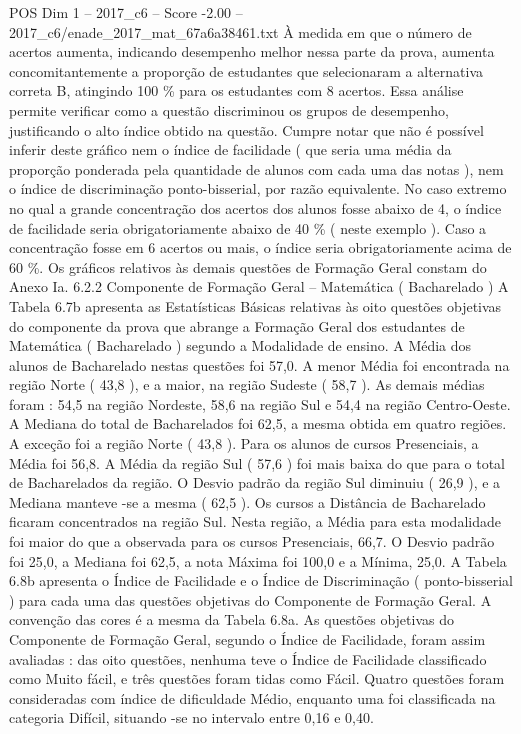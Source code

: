 \begin{textsample}{POS Dim 1 – 2017\_c6 – Score -2.00 – 2017\_c6/enade\_2017\_mat\_67a6a38461.txt}
À medida em que o número de acertos aumenta, indicando desempenho melhor nessa parte da prova, aumenta concomitantemente a proporção de estudantes que selecionaram a alternativa correta B, atingindo 100 \% para os estudantes com 8 acertos.
Essa análise permite verificar como a questão discriminou os grupos de desempenho, justificando o alto índice obtido na questão.
Cumpre notar que não é possível inferir deste gráfico nem o índice de facilidade ( que seria uma média da proporção ponderada pela quantidade de alunos com cada uma das notas ), nem o índice de discriminação ponto-bisserial, por razão equivalente.
No caso extremo no qual a grande concentração dos acertos dos alunos fosse abaixo de 4, o índice de facilidade seria obrigatoriamente abaixo de 40 \% ( neste exemplo ).
Caso a concentração fosse em 6 acertos ou mais, o índice seria obrigatoriamente acima de 60 \%.
Os gráficos relativos às demais questões de Formação Geral constam do Anexo Ia. 6.2.2 Componente de Formação Geral – Matemática ( Bacharelado ) A Tabela 6.7b apresenta as Estatísticas Básicas relativas às oito questões objetivas do componente da prova que abrange a Formação Geral dos estudantes de Matemática ( Bacharelado ) segundo a Modalidade de ensino.
A Média dos alunos de Bacharelado nestas questões foi 57,0.
A menor Média foi encontrada na região Norte ( 43,8 ), e a maior, na região Sudeste ( 58,7 ).
As demais médias foram : 54,5 na região Nordeste, 58,6 na região Sul e 54,4 na região Centro-Oeste.
A Mediana do total de Bacharelados foi 62,5, a mesma obtida em quatro regiões.
A exceção foi a região Norte ( 43,8 ).
Para os alunos de cursos Presenciais, a Média foi 56,8.
A Média da região Sul ( 57,6 ) foi mais baixa do que para o total de Bacharelados da região.
O Desvio padrão da região Sul diminuiu ( 26,9 ), e a Mediana manteve -se a mesma ( 62,5 ).
Os cursos a Distância de Bacharelado ficaram concentrados na região Sul.
Nesta região, a Média para esta modalidade foi maior do que a observada para os cursos Presenciais, 66,7.
O Desvio padrão foi 25,0, a Mediana foi 62,5, a nota Máxima foi 100,0 e a Mínima, 25,0.
A Tabela 6.8b apresenta o Índice de Facilidade e o Índice de Discriminação ( ponto-bisserial ) para cada uma das questões objetivas do Componente de Formação Geral.
A convenção das cores é a mesma da Tabela 6.8a.
As questões objetivas do Componente de Formação Geral, segundo o Índice de Facilidade, foram assim avaliadas : das oito questões, nenhuma teve o Índice de Facilidade classificado como Muito fácil, e três questões foram tidas como Fácil.
Quatro questões foram consideradas com índice de dificuldade Médio, enquanto uma foi classificada na categoria Difícil, situando -se no intervalo entre 0,16 e 0,40.

\end{textsample}
